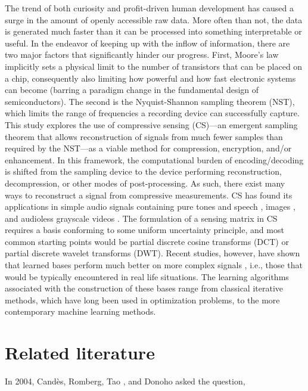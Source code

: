 The trend of both curiosity and profit-driven human development has caused a surge in the amount of openly accessible raw data. More often than not, the data is generated much faster than it can be processed into something interpretable or useful. In the endeavor of keeping up with the inflow of information, there are two major factors that significantly hinder our progress. First, Moore's law implicitly sets a physical limit to the number of transistors that can be placed on a chip, consequently also limiting how powerful and how fast electronic systems can become (barring a paradigm change in the fundamental design of semiconductors). The second is the Nyquist-Shannon sampling theorem (NST), which limits the range of frequencies a recording device can successfully capture. This study explores the use of compressive sensing (CS)---an emergent sampling theorem that allows reconstruction of signals from much fewer samples than required by the NST---as a viable method for compression, encryption, and/or enhancement. In this framework, the computational burden of encoding/decoding is shifted from the sampling device to the device performing reconstruction, decompression, or other modes of post-processing. As such, there exist many ways to reconstruct a signal from compressive measurements. CS has found its applications in simple audio signals containing pure tones \cite{Mathew2016,Andras2018} and speech \cite{Low2013,Low2018,Abrol2015}, images \cite{Mo2013,Zhou2016,Romero2016}, and audioless grayscale videos \cite{Liu2014,Chen2014}. The formulation of a sensing matrix in CS requires a basis conforming to some uniform uncertainty principle, and most common starting points would be partial discrete cosine transforms (DCT) or partial discrete wavelet transforms (DWT). Recent studies, however, have shown that learned bases perform much better on more complex signals \cite{Liu2013,Sharma2018,Eslahi2016}, i.e., those that would be typically encountered in real life situations. The learning algorithms associated with the construction of these bases range from classical iterative methods, which have long been used in optimization problems, to the more contemporary machine learning methods.


\section{Related literature}
\label{sec:rrl}
In 2004, Cand\`{e}s, Romberg, Tao \cite{Candes2006}, and Donoho \cite{Donoho2006} asked the question, 

